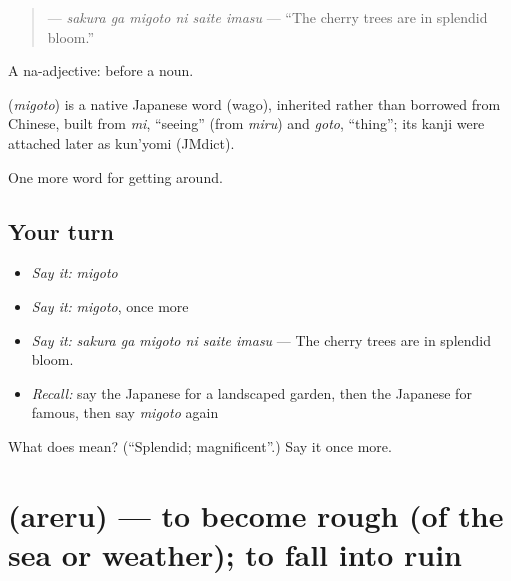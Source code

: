 \begin{quote}
\textbf{  } — \emph{sakura ga migoto ni saite imasu} — \textquotedblleft{}The cherry trees are in splendid bloom.\textquotedblright{}
\end{quote}

A na-adjective:  before a noun.

\begin{cousinweb}
\textbf{} (\emph{migoto}) is a native Japanese word (wago), inherited rather than borrowed from Chinese, built from \emph{mi}, \textquotedblleft{}seeing\textquotedblright{} (from \emph{miru}) and \emph{goto}, \textquotedblleft{}thing\textquotedblright{}; its kanji were attached later as kun'yomi (JMdict).
\end{cousinweb}

\begin{grammarlens}[title={What you've built}]
One more word for getting around.
\end{grammarlens}

\subsection*{Your turn}
\begin{itemize}
\raggedright
  \item \emph{Say it:} \emph{migoto}
  \item \emph{Say it:} \emph{migoto}, once more
  \item \emph{Say it:} \emph{sakura ga migoto ni saite imasu} — The cherry trees are in splendid bloom.
  \item \emph{Recall:} say the Japanese for a landscaped garden, then the Japanese for famous, then say \emph{migoto} again
\end{itemize}

\begin{tcolorbox}[breakable,colback=teal!4,colframe=teal!35!black,title={Before you move on}]
What does  mean? (\textquotedblleft{}Splendid; magnificent\textquotedblright{}.) Say it once more.
\end{tcolorbox}
\section[\texorpdfstring{\ja{あれる} (areru)}{あれる (areru)}]{ (areru) — to become rough (of the sea or weather); to fall into ruin}

\label{lesson:JA-C405-areru}



